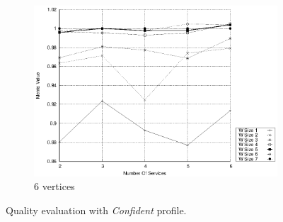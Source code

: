 \begin{figure}[ht]
\begin{subfigure}{0.33\textwidth}
    \includegraphics[width=\textwidth]{Images/graphs/window_quality_performance_diff_qual_n7_s7_20_100_n7}
    \caption{6 vertices}
    \label{fig:quality_window_average_qualitative_n7}
  \end{subfigure}
  \caption{ Quality evaluation with \textit{Confident} profile.}
  \label{fig:quality_window_average_qualitative}
\end{figure}

